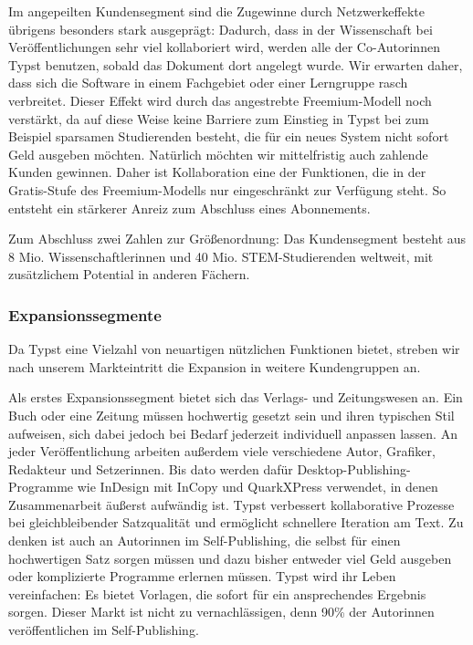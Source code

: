 \documentclass[11pt, a4paper]{article}
\newcommand{\gender}{\raisebox{-.25em}{*}}
\renewcommand{\glossary} {\marginsymbol{$\hookrightarrow$}}
\newcommand{\cited}[1]{\marginsymbol{$\nearrow$ #1}}
\newcommand{\marginsymbol}[1] {\protect\marginsymbolhelper{#1}}
\newcommand{\marginsymbolhelper}[1] {\tabto*{-1cm}\makebox[0cm]{#1}\tabto*{\TabPrevPos}}
\begin{document}
Im angepeilten Kundensegment sind die Zugewinne durch \glossary Netzwerkeffekte übrigens besonders stark ausgeprägt: Dadurch, dass in der Wissenschaft bei Veröffentlichungen sehr viel kollaboriert wird, werden alle der Co-Autor\gender{}innen Typst benutzen, sobald das Dokument dort angelegt wurde. Wir erwarten daher, dass sich die Software in einem Fachgebiet oder einer Lerngruppe rasch verbreitet. Dieser Effekt wird durch das angestrebte \glossary Freemium-Modell noch verstärkt, da auf diese Weise keine Barriere zum Einstieg in Typst bei zum Beispiel sparsamen Studierenden besteht, die für ein neues System nicht sofort Geld ausgeben möchten. Natürlich möchten wir mittelfristig auch zahlende Kunden gewinnen. Daher ist Kollaboration eine der Funktionen, die in der Gratis-Stufe des Freemium-Modells nur eingeschränkt zur Verfügung steht. So entsteht ein stärkerer Anreiz zum Abschluss eines Abonnements.


Zum Abschluss zwei Zahlen zur Größenordnung: Das Kundensegment besteht aus \cited{7}8 Mio. Wissenschaftler\gender{}innen und \cited{8}40 Mio. STEM-Studierenden weltweit, mit zusätzlichem Potential in anderen Fächern.

\subsubsection*{Expansionssegmente}

Da Typst eine Vielzahl von neuartigen nützlichen Funktionen bietet, streben wir nach unserem Markteintritt die Expansion in weitere Kundengruppen an.

Als erstes Expansionssegment bietet sich das Verlags- und Zeitungswesen an. Ein Buch oder eine Zeitung müssen hochwertig gesetzt sein und ihren typischen Stil aufweisen, sich dabei jedoch bei Bedarf jederzeit individuell anpassen lassen. An jeder Veröffentlichung arbeiten außerdem viele verschiedene Autor\gender{}, Grafiker\gender{}, Redakteur\gender{} und Setzer\gender{}innen. Bis dato werden dafür Desktop-Publishing-Programme wie InDesign mit InCopy und QuarkXPress verwendet, in denen Zusammenarbeit äußerst aufwändig ist. Typst verbessert kollaborative Prozesse bei gleichbleibender Satzqualität und ermöglicht schnellere Iteration am Text. Zu denken ist auch an Autor\gender{}innen im Self-Publishing, die selbst für einen hochwertigen Satz sorgen müssen und dazu bisher entweder viel Geld ausgeben oder komplizierte Programme erlernen müssen. Typst wird ihr Leben vereinfachen: Es bietet Vorlagen, die sofort für ein ansprechendes Ergebnis sorgen. Dieser Markt ist nicht zu vernachlässigen, denn \cited{9} 90\% der Autor\gender{}innen veröffentlichen im Self-Publishing.
\end{document}
